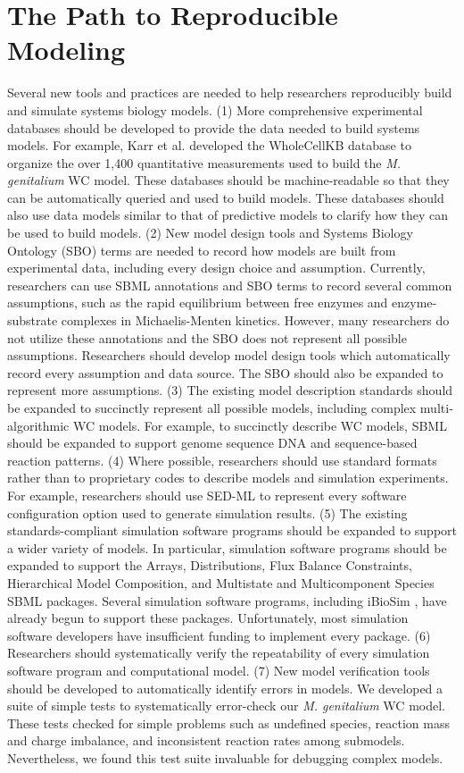 \documentclass[journal,transmag,twoside]{IEEEtran}
\begin{document}
\section{The Path to Reproducible Modeling}

Several new tools and practices are needed to help researchers reproducibly build and simulate systems biology models. (1) More comprehensive experimental databases should be developed to provide the data needed to build systems models.  For example, Karr et al. developed the WholeCellKB database \cite{karr2013wholecellkb} to organize the over 1,400 quantitative measurements used to build the \textit{M. genitalium} WC model. These databases should be machine-readable so that they can be automatically queried and used to build models. These databases should also use data models similar to that of predictive models to clarify how they can be used to build models. (2) New model design tools and Systems Biology Ontology (SBO) \cite{juty2013systems} terms are needed to record how models are built from experimental data, including every design choice and assumption. Currently, researchers can use SBML annotations and SBO terms to record several common assumptions, such as the rapid equilibrium between free enzymes and enzyme-substrate complexes in Michaelis-Menten kinetics. However, many researchers do not utilize these annotations and the SBO does not represent all possible assumptions. Researchers should develop model design tools which automatically record every assumption and data source. The SBO should also be expanded to represent more assumptions. (3) The existing model description standards should be expanded to succinctly represent all possible models, including complex multi-algorithmic WC models. For example, to succinctly describe WC models, SBML should be expanded to support genome sequence DNA and sequence-based reaction patterns. (4) Where possible, researchers should use standard formats rather than to proprietary codes to describe models and simulation experiments. For example, researchers should use SED-ML to represent every software configuration option used to generate simulation results. (5) The existing standards-compliant simulation software programs should be expanded to support a wider variety of models. In particular, simulation software programs should be expanded to support the Arrays, Distributions, Flux Balance Constraints, Hierarchical Model Composition, and Multistate and Multicomponent Species SBML packages. Several simulation software programs, including iBioSim \cite{Stevens2013}, have already begun to support these packages. Unfortunately, most simulation software developers have insufficient funding to implement every package. (6) Researchers should systematically verify the repeatability of every simulation software program and computational model. (7) New model verification tools should be developed to automatically identify errors in models. We developed a suite of simple tests to systematically error-check our \textit{M. genitalium} WC model. These tests checked for simple problems such as undefined species, reaction mass and charge imbalance, and inconsistent reaction rates among submodels. Nevertheless, we found this test suite invaluable for debugging complex models. 
\end{document}
